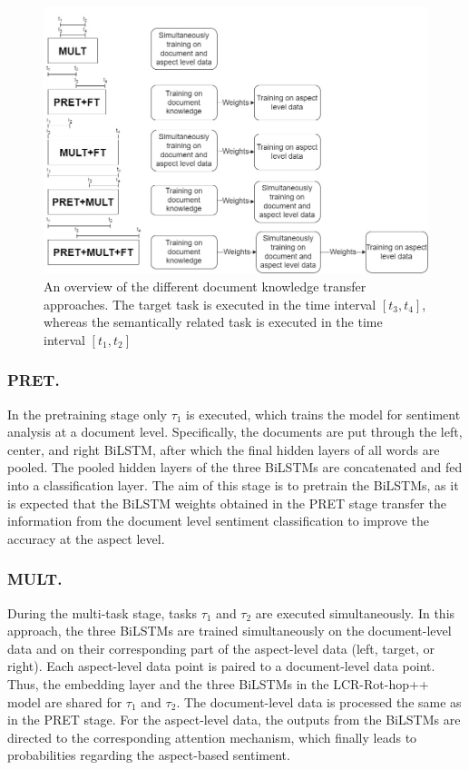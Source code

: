 \documentclass[runningheads]{llncs}
\begin{document}
\begin{figure}[h]
    \centering
    \includegraphics[width=\textwidth]{Images/PRET_MULT.jpg}
    \caption{An overview of the different document knowledge transfer approaches. The target task is executed in the time interval $[t_3, t_4]$, whereas the semantically related task is executed in the time interval $[t_1, t_2]$}
    \label{fig:pretmultft}
\end{figure}

\subsubsection{PRET.}
In the pretraining stage only $\tau_1$ is executed, which trains the model for sentiment analysis at a document level. Specifically, the documents are put through the left, center, and right BiLSTM, after which the final hidden layers of all words are pooled. The pooled hidden layers of the three BiLSTMs are concatenated and fed into a classification layer. The aim of this stage is to pretrain the BiLSTMs, as it is expected that the BiLSTM weights obtained in the PRET stage transfer the information from the document level sentiment classification to improve the accuracy at the aspect level.

\subsubsection{MULT.}
During the multi-task stage, tasks $\tau_1$ and $\tau_2$ are executed simultaneously.  In this approach, the three BiLSTMs are trained simultaneously on the document-level data and on their corresponding part of the aspect-level data (left, target, or right). Each aspect-level data point is paired to a document-level data point. Thus, the embedding layer and the three BiLSTMs in the LCR-Rot-hop++ model are shared for $\tau_1$ and $\tau_2$. The document-level data is processed the same as in the PRET stage. For the aspect-level data, the outputs from the BiLSTMs are directed to the corresponding attention mechanism, which finally leads to probabilities regarding the aspect-based sentiment.
\end{document}
